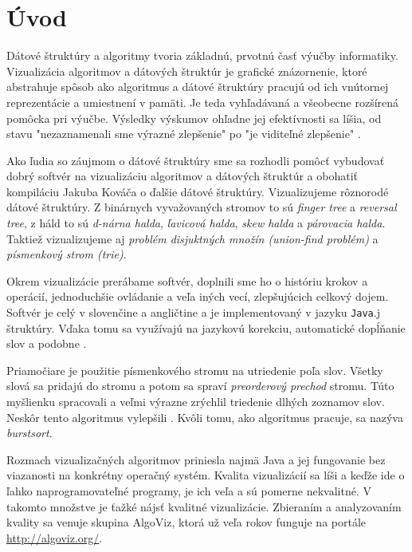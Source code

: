 \section{Úvod}
Dátové štruktúry a algoritmy tvoria základnú, prvotnú časť výučby 
informatiky. Vizualizácia algoritmov a dátových štruktúr je grafické 
znázornenie, ktoré abstrahuje spôsob ako algoritmus a dátové štruktúry 
pracujú od ich vnútornej reprezentácie a umiestnení v pamäti. Je teda 
vyhľadávaná a všeobecne rozšírená pomôcka pri výučbe. Výsledky výskumov 
ohľadne jej efektívnosti sa líšia, od stavu "nezaznamenali sme výrazné 
zlepšenie" po "je viditeľné zlepšenie" \citep{shaffer}.

Ako ľudia so záujmom o dátové štruktúry sme sa rozhodli pomôcť vybudovať 
dobrý softvér na vizualizáciu algoritmov a dátových štruktúr a obohatiť 
kompiláciu Jakuba Kováča \citep{kuko} o ďalšie dátové štruktúry. 
Vizualizujeme rôznorodé dátové štruktúry. Z binárnych vyvažovaných stromov 
to sú \emph{finger tree} a \emph{reversal tree}, z háld to sú \emph{d-nárna 
halda}, \emph{ľavicová halda}, \emph{skew halda} a \emph{párovacia halda}. 
Taktiež vizualizujeme aj \emph{problém disjuktných množín (union-find 
problém)} a \emph{písmenkový strom (trie)}. 

Okrem vizualizácie prerábame softvér, doplnili sme ho o históriu krokov 
a operácií, jednoduchšie ovládanie a veľa iných vecí, zlepšujúcich 
celkový dojem. Softvér je celý v slovenčine a angličtine a je 
implementovaný v jazyku \texttt{Java}.j štruktúry. Vďaka tomu sa využívajú na jazykovú korekciu, 
automatické dopĺňanie slov a podobne \citep{scrabble,ca}. 

Priamočiare je použitie písmenkového stromu na utriedenie poľa slov. 
Všetky slová sa pridajú do stromu a potom sa spraví \emph{preorderový prechod} 
stromu. Túto myšlienku spracovali \citet{burstsort1} a veľmi výrazne zrýchlil 
triedenie dlhých zoznamov slov. Neskôr tento algoritmus vylepšili 
\citet{burstsort2}. Kvôli tomu, ako algoritmus pracuje, 
sa nazýva \emph{burstsort}.


Rozmach vizualizačných algoritmov priniesla najmä Java a jej fungovanie 
bez viazanosti na konkrétny operačný systém. Kvalita vizualizácií sa líši 
a keďže ide o ľahko naprogramovateľné programy, je ich veľa a sú pomerne 
nekvalitné. V takomto množstve je ťažké nájsť kvalitné vizualizácie. 
Zbieraním a analyzovaním kvality sa venuje skupina AlgoViz, ktorá už 
veľa rokov funguje na portále \url{http://algoviz.org/}.

